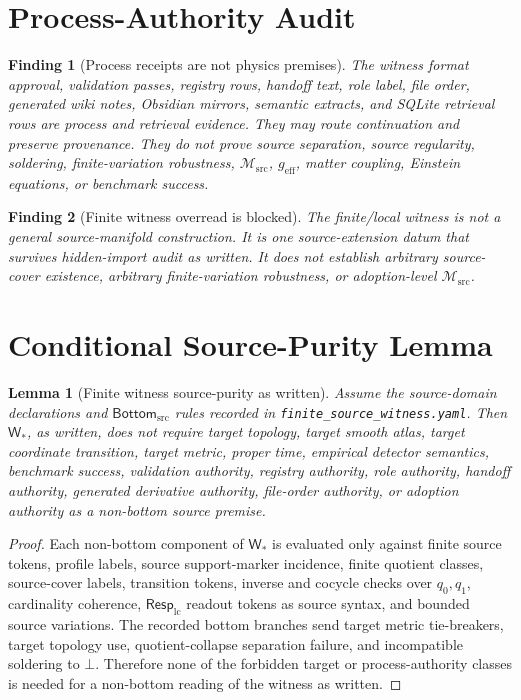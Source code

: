 \documentclass[11pt]{article}
\newcommand{\RespLC}{\mathsf{Resp}_{\mathrm{lc}}}
\newcommand{\Msrc}{\mathcal{M}_{\mathrm{src}}}
\newcommand{\geff}{g_{\mathrm{eff}}}
\newcommand{\BottomSrc}{\mathsf{Bottom}_{\mathrm{src}}}
\newcommand{\Bot}{\bot}
\newtheorem{finding}{Finding}
\newtheorem{lemma}{Lemma}
\begin{document}
\section{Process-Authority Audit}

\begin{finding}[Process receipts are not physics premises]
The witness format approval, validation passes, registry rows, handoff text,
role label, file order, generated wiki notes, Obsidian mirrors, semantic
extracts, and SQLite retrieval rows are process and retrieval evidence. They
may route continuation and preserve provenance. They do not prove source
separation, source regularity, soldering, finite-variation robustness,
\(\Msrc\), \(\geff\), matter coupling, Einstein equations, or benchmark
success.
\end{finding}

\begin{finding}[Finite witness overread is blocked]
The finite/local witness is not a general source-manifold construction. It is
one source-extension datum that survives hidden-import audit as written. It
does not establish arbitrary source-cover existence, arbitrary
finite-variation robustness, or adoption-level \(\Msrc\).
\end{finding}

\section{Conditional Source-Purity Lemma}

\begin{lemma}[Finite witness source-purity as written]
Assume the source-domain declarations and \(\BottomSrc\) rules recorded in
\texttt{finite\_source\_witness.yaml}. Then \(\mathsf{W}_*\), as written,
does not require target topology, target smooth atlas, target coordinate
transition, target metric, proper time, empirical detector semantics,
benchmark success, validation authority, registry authority, role authority,
handoff authority, generated derivative authority, file-order authority, or
adoption authority as a non-bottom source premise.
\end{lemma}

\begin{proof}
Each non-bottom component of \(\mathsf{W}_*\) is evaluated only against finite
source tokens, profile labels, source support-marker incidence, finite
quotient classes, source-cover labels, transition tokens, inverse and cocycle
checks over \(q_0,q_1\), cardinality coherence, \(\RespLC\) readout tokens as
source syntax, and bounded source variations. The recorded bottom branches
send target metric tie-breakers, target topology use, quotient-collapse
separation failure, and incompatible soldering to \(\Bot\). Therefore none of
the forbidden target or process-authority classes is needed for a non-bottom
reading of the witness as written.
\end{proof}
\end{document}
